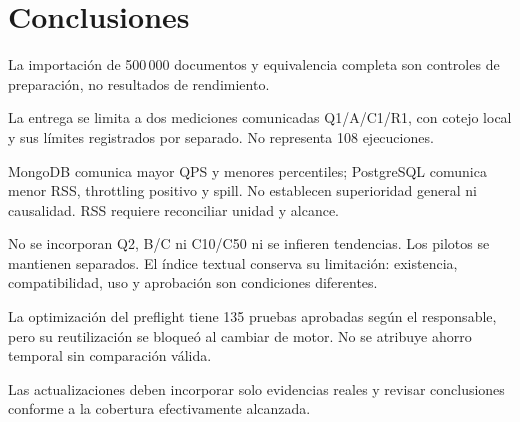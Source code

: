 \section*{Conclusiones}
La importación de 500\,000 documentos y equivalencia completa son
controles de preparación, no resultados de rendimiento.

La entrega se limita a dos mediciones comunicadas Q1/A/C1/R1, con cotejo
local y sus límites registrados por separado. No representa 108 ejecuciones.

MongoDB comunica mayor QPS y menores percentiles; PostgreSQL comunica
menor RSS, throttling positivo y spill. No establecen superioridad general
ni causalidad. RSS requiere reconciliar unidad y alcance.

No se incorporan Q2, B/C ni C10/C50 ni se infieren tendencias. Los pilotos
se mantienen separados. El índice textual conserva su limitación:
existencia, compatibilidad, uso y aprobación son condiciones diferentes.

La optimización del preflight tiene 135 pruebas aprobadas según el
responsable, pero su reutilización se bloqueó al cambiar de motor.
No se atribuye ahorro temporal sin comparación válida.

Las actualizaciones deben incorporar solo evidencias reales y revisar
conclusiones conforme a la cobertura efectivamente alcanzada.
